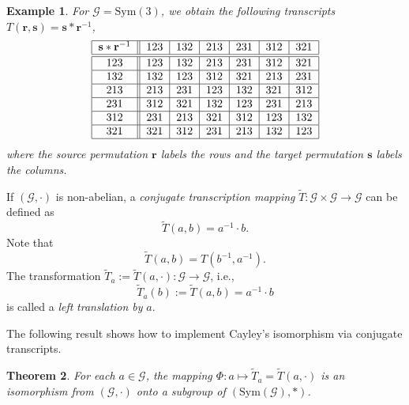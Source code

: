 \documentclass[%
 aip,
 amsmath,amssymb,
 reprint,%
]{revtex4-1}
\newtheorem{theorem}{Theorem}
\newtheorem{example}[theorem]{Example}
\begin{document}
\begin{example}
For $\mathcal{G}=\mathrm{Sym}(3)$, we obtain the following transcripts $T(%
\mathbf{r},\mathbf{s})=\mathbf{s}\ast \mathbf{r}^{-1}$,%
\begin{equation*}
\begin{tabular}{|c||l|l|l|l|l|l|}
\hline
$\mathbf{s}\ast \mathbf{r}^{-1}$ & $123$ & $132$ & $213$ & $231$ & $312$ & $%
321$ \\ \hline\hline
$123$ & $123$ & $132$ & $213$ & $231$ & $312$ & $321$ \\ \hline
$132$ & $132$ & $123$ & $312$ & $321$ & $213$ & $231$ \\ \hline
$213$ & $213$ & $231$ & $123$ & $132$ & $321$ & $312$ \\ \hline
$231$ & $312$ & $321$ & $132$ & $123$ & $231$ & $213$ \\ \hline
$312$ & $231$ & $213$ & $321$ & $312$ & $123$ & $132$ \\ \hline
$321$ & $321$ & $312$ & $231$ & $213$ & $132$ & $123$ \\ \hline
\end{tabular}%
\end{equation*}%
where the source permutation $\mathbf{r}$ labels the rows and the target
permutation $\mathbf{s}$ labels the columns.
\end{example}

If $(\mathcal{G},\cdot )$ is non-abelian, a \emph{conjugate transcription
mapping} $\tilde{T}:\mathcal{G}\times \mathcal{G}\rightarrow \mathcal{G}$
can be defined as%
\begin{equation}
\tilde{T}(a,b)=a^{-1}\cdot b.  \label{T(a,b) conjugate}
\end{equation}%
Note that%
\begin{equation}
\tilde{T}(a,b)=T(b^{-1},a^{-1}).  \label{T conj = T}
\end{equation}%
The transformation $\tilde{T}_{a}:=\tilde{T}(a,\cdot ):\mathcal{G}%
\rightarrow \mathcal{G}$, i.e.,%
\begin{equation}
\tilde{T}_{a}(b):=\tilde{T}(a,b)=a^{-1}\cdot b  \label{Ta(b) conjugate}
\end{equation}%
is called a \textit{left} \textit{translation by} $a$.

The following result shows how to implement Cayley's isomorphism via
conjugate transcripts.

\begin{theorem}
\label{ThmCayleyViaTranscripts}For each $a\in \mathcal{G}$, the mapping $%
\Phi :a\mapsto \tilde{T}_{a}=\tilde{T}(a,\cdot )$ is an isomorphism from $(%
\mathcal{G},\cdot )$ onto a subgroup of $(\mathrm{Sym}(\mathcal{G}),\ast )$.
\end{theorem}
\end{document}
